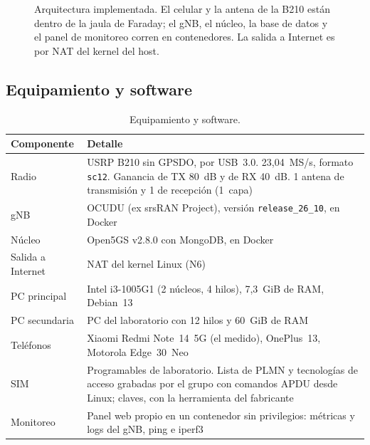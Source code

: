 \begin{figure}[htbp]
{}
\caption{Arquitectura implementada. El celular y la antena de la B210 están dentro de la jaula de Faraday; el gNB, el núcleo, la base de datos y el panel de monitoreo corren en contenedores. La salida a Internet es por NAT del kernel del host.}
\label{fig:arquitectura}
\end{figure}

\subsection{Equipamiento y software}
\begin{table}[htbp]
\centering
\caption{Equipamiento y software.}
\label{tab:equipos}
\begin{tabularx}{\linewidth}{lX}
\toprule
Componente & Detalle \\
\midrule
Radio & USRP B210 sin GPSDO, por USB~3.0. 23,04~MS/s, formato \texttt{sc12}. Ganancia de TX 80~dB y de RX 40~dB. 1 antena de transmisión y 1 de recepción (1~capa) \\
gNB & OCUDU (ex srsRAN Project), versión \texttt{release\_26\_10}, en Docker \\
Núcleo & Open5GS v2.8.0 con MongoDB, en Docker \\
Salida a Internet & NAT del kernel Linux (N6) \\
PC principal & Intel i3-1005G1 (2 núcleos, 4 hilos), 7,3~GiB de RAM, Debian~13 \\
PC secundaria & PC del laboratorio con 12 hilos y 60~GiB de RAM \\
Teléfonos & Xiaomi Redmi Note~14~5G (el medido), OnePlus~13, Motorola Edge~30~Neo \\
SIM & Programables de laboratorio. Lista de PLMN y tecnologías de acceso grabadas por el grupo con comandos APDU desde Linux; claves, con la herramienta del fabricante \\
Monitoreo & Panel web propio en un contenedor sin privilegios: métricas y logs del gNB, ping e iperf3 \\
\bottomrule
\end{tabularx}
\end{table}

